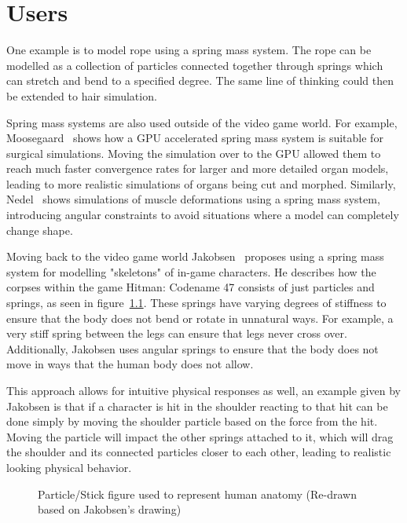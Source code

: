 \chapter{Users}
One example is to model rope using a spring mass system. The rope can be modelled as a collection of particles
connected together through springs which can stretch and bend to a specified degree.
The same line of thinking could then be extended to hair simulation.

Spring mass systems are also used outside of the video game world.
For example, Moosegaard~\cite{mosegaards_clothing_simulation} shows how a GPU accelerated spring mass system is suitable 
for surgical simulations. Moving the simulation over to the GPU allowed them to reach much faster convergence rates for
larger and more detailed organ models, leading to more realistic simulations of organs being cut and morphed.
Similarly, Nedel~\cite{nedel_muscle_spring_mass} shows simulations of muscle deformations using a spring mass system,
introducing angular constraints to avoid situations where a model can completely change shape.

Moving back to the video game world Jakobsen~\cite{jakobsen_advanced_character_physics} proposes using a spring mass system
for modelling "skeletons" of in-game characters. 
He describes how the corpses within the game Hitman: Codename 47 consists of just particles and springs, as seen in figure~\ref{fig:spring_mass_skeleton}.
These springs have varying degrees of stiffness to ensure that the body does not bend or rotate in unnatural ways.
For example, a very stiff spring between the legs can ensure that legs never cross over.
Additionally, Jakobsen uses angular springs to ensure that the body does not move in ways that the human body does not allow.

This approach allows for intuitive physical responses as well, an example given by Jakobsen is that if a character is hit in the shoulder
reacting to that hit can be done simply by moving the shoulder particle based on the force from the hit.
Moving the particle will impact the other springs attached to it, which will drag the shoulder and its connected particles closer to each other,
leading to realistic looking physical behavior.

\begin{figure}
    \centering
    \caption{Particle/Stick figure used to represent human anatomy (Re-drawn based on Jakobsen's drawing\cite{jakobsen_advanced_character_physics})}
    \label{fig:spring_mass_skeleton}
\end{figure}






